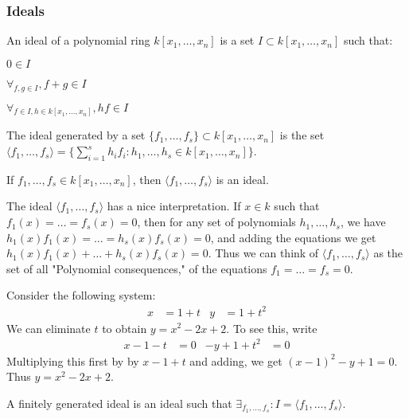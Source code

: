 \documentclass[crop=false,class=book]{standalone}
\begin{document}
\subsubsection{Ideals}
\begin{definition}
An ideal of a polynomial ring $k[x_1,\hdots ,x_n]$ is a set $I\subset k[x_1,\hdots ,x_n]$ such that:
\begin{enumerate}
\begin{multicols}{3}
    \item $0\in I$
    \item $\forall_{f,g\in I}, f+g\in I$ 
    \item $\forall_{f\in I, h\in k[x_1,\hdots ,x_n]}, hf\in I$
\end{multicols}
\end{enumerate}
\end{definition}
\begin{definition}
The ideal generated by a set $\{f_1,\hdots, f_s\} \subset k[x_1,\hdots ,x_n]$ is the set $\langle f_1,\hdots, f_s\rangle = \{\sum_{i=1}^{s} h_i f_i:h_1,\hdots, h_s\in k[x_1,\hdots ,x_n]\}$.
\end{definition}
\begin{theorem}
If $f_1,\hdots, f_s\in k[x_1,\hdots ,x_n]$, then $\langle f_1,\hdots, f_s\rangle$ is an ideal.
\end{theorem}
\begin{remark}
The ideal $\langle f_1,\hdots, f_s\rangle$ has a nice interpretation. If $x\in k$ such that $f_1(x) = \hdots = f_s(x) = 0$, then for any set of polynomials $h_1,\hdots, h_s$, we have $h_1(x)f_1(x) = \hdots = h_s(x)f_s(x) = 0$, and adding the equations we get $h_1(x)f_1(x)+\hdots + h_s(x)f_s(x) = 0$. Thus we can think of $\langle f_1,\hdots, f_s\rangle$ as the set of all "Polynomial consequences," of the equations $f_1 = \hdots = f_s = 0$.
\end{remark}
\begin{example}
Consider the following system:
\begin{align*}
    x&=1+t&y&=1+t^{2}
\end{align*}
We can eliminate $t$ to obtain $y = x^2-2x+2$. To see this, write
\begin{align*}
    x-1-t&=0&-y+1+t^{2}&=0
\end{align*}
Multiplying this first by by $x-1+t$ and adding, we get $(x-1)^2-y+1 = 0$. Thus $y = x^2-2x+2$.
\end{example}
\begin{definition}
A finitely generated ideal is an ideal such that $\exists_{f_1,\hdots, f_s}: I = \langle f_1,\hdots, f_s\rangle$.
\end{definition}
\end{document}
